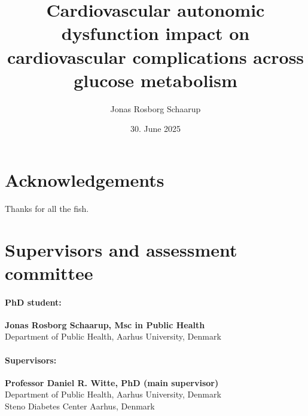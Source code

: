 \documentclass[
  a4paper,
  headsepline=true,
  open=any]{scrbook}
\title{Cardiovascular autonomic dysfunction impact on cardiovascular
complications across glucose metabolism}
\author{Jonas Rosborg Schaarup}
\date{30. June 2025}
\begin{document}
\frontmatter
\maketitle
\ifdefined\Shaded\renewenvironment{Shaded}{\begin{tcolorbox}[interior hidden, borderline west={3pt}{0pt}{shadecolor}, breakable, enhanced, sharp corners, boxrule=0pt, frame hidden]}{\end{tcolorbox}}\fi

\mainmatter
{}

\hypertarget{acknowledgements}{%
\chapter*{Acknowledgements}\label{acknowledgements}}


Thanks for all the fish.


\hypertarget{supervisors-and-assessment-committee}{%
\chapter*{Supervisors and assessment
committee}\label{supervisors-and-assessment-committee}}


\hypertarget{phd-student}{%
\subsubsection*{PhD student:}\label{phd-student}}

\textbf{Jonas Rosborg Schaarup, Msc in Public Health}\\
Department of Public Health, Aarhus University, Denmark

\hypertarget{supervisors}{%
\subsubsection*{Supervisors:}\label{supervisors}}

\textbf{Professor Daniel R. Witte, PhD (main supervisor)}\\
Department of Public Health, Aarhus University, Denmark\\
Steno Diabetes Center Aarhus, Denmark
\end{document}
